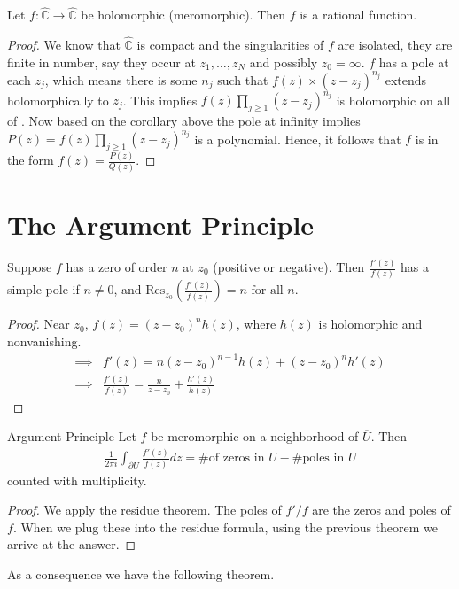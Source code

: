 \documentclass{article}
\begin{document}
\begin{thrm}{}{}
Let \( f: \hat{\mathbb{C}} \to \hat{\mathbb{C}}  \) be holomorphic (meromorphic). Then \( f \) is a rational function. 

\tcbline
\begin{proof}
We know that \( \hat{\mathbb{C}}  \) is compact and the singularities of \( f \) are isolated, they are finite in number, say they occur at \( z_1, \dots , z_N \) and possibly \( z_ 0 = \infty  \). \( f \) has a pole at each \( z_{j}  \), which means there is some \( n_{j}  \) such that \( f(z)\times (z - z_{j} )^{n_{j} }  \) extends holomorphically to \( z_{j}  \). This implies \( f(z)\prod_{j\geq 1}(z - z_{j} )^{n_{j} }   \) is holomorphic on all of \C{}. Now based on the corollary above the pole at infinity implies \( P(z) = f(z)\prod_{j\geq 1}(z - z_{j} )^{n_{j} } \) is a polynomial. Hence, it follows that \( f \) is in the form \( f(z) = \frac{P(z)}{Q(z)}  \).  
\end{proof}


\end{thrm}

\section{The Argument Principle}

\begin{thrm}{}{}
Suppose \( f \) has a zero of order \( n \) at \( z_0 \) (positive or negative). Then \( \frac{f'(z)}{f(z)}  \) has a simple pole if \( n\neq 0 \), and \( \mathrm{Res}_{z_0}(\frac{f'(z)}{f(z)} ) = n  \text{ for all }    n  \). 

\tcbline
\begin{proof}
Near \( z_0 \), \( f(z) = (z - z_0)^{n}h(z)  \), where \( h(z) \) is holomorphic and nonvanishing. 
\begin{align*}
    \implies& f'(z) = n(z - z_0)^{n -1}h(z)+(z - z_0)^n h'(z)\\
    \implies& \frac{f'(z)}{f(z)} = \frac{n}{z - z_0}+\frac{h'(z)}{h(z)}   
\end{align*}

\end{proof}

\end{thrm}

\begin{thrm}{Argument Principle}{}
Let \( f \) be meromorphic on a neighborhood of \( \overline{U}  \). Then
\begin{align*}
    \frac{1}{2\pi i}\int _{\partial U} \frac{f'(z)}{f(z)} dz = \text{\# of zeros in } U  - \text{\# poles in } U 
\end{align*}
counted with multiplicity. 

\tcbline

\begin{proof}
We apply the residue theorem. The poles of \( f'/f \) are the zeros and poles of \( f \). When we plug these into the residue formula, using the previous theorem we arrive at the answer. 
\end{proof}

\end{thrm}
As a consequence we have the following theorem.
\end{document}
